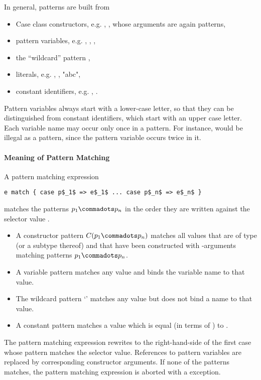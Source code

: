 In general, patterns are built from
\begin{itemize}
\item Case class constructors, e.g. , , whose arguments
      are again patterns,
\item pattern variables, e.g. , , ,
\item the ``wildcard'' pattern \code{_},
\item literals, e.g. , , "abc", 
\item constant identifiers, e.g. , .
\end{itemize}
Pattern variables always start with a lower-case letter, so that they
can be distinguished from constant identifiers, which start with an
upper case letter.  Each variable name may occur only once in a
pattern. For instance,  would be illegal as a pattern,
since the pattern variable  occurs twice in it.

\paragraph{Meaning of Pattern Matching}
A pattern matching expression 
\begin{lstlisting}
e match { case p$_1$ => e$_1$ ... case p$_n$ => e$_n$ }
\end{lstlisting}
matches the patterns $p_1 \commadots p_n$ in the order they
are written against the selector value .
\begin{itemize}
\item
A constructor pattern $C(p_1 \commadots p_n)$ matches all values that
are of type  (or a subtype thereof) and that have been constructed with 
-arguments matching patterns $p_1 \commadots p_n$.
\item 
A variable pattern  matches any value and binds the variable
name to that value.  
\item 
The wildcard pattern `\code{_}' matches any value but does not bind a name to that value. 
\item A constant pattern  matches a value which is
equal (in terms of \code{==}) to .
\end{itemize}
The pattern matching expression rewrites to the right-hand-side of the
first case whose pattern matches the selector value. References to
pattern variables are replaced by corresponding constructor arguments.
If none of the patterns matches, the pattern matching expression is
aborted with a  exception.

